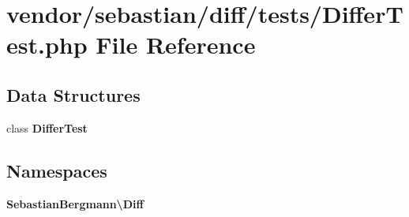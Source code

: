 \section{vendor/sebastian/diff/tests/\+Differ\+Test.php File Reference}
\label{_differ_test_8php}
\subsection*{Data Structures}
\begin{DoxyCompactItemize}
\item 
class {\bf Differ\+Test}
\end{DoxyCompactItemize}
\subsection*{Namespaces}
\begin{DoxyCompactItemize}
\item 
 {\bf Sebastian\+Bergmann\textbackslash{}\+Diff}
\end{DoxyCompactItemize}
